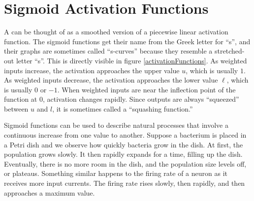 \section{Sigmoid Activation Functions}


A  can be thought of as a smoothed version of a piecewise linear activation function. The sigmoid functions get their name from the Greek letter for ``s'', and their graphs are sometimes called ``s-curves'' because they resemble a stretched-out letter ``s''. This is directly visible in figure \ref{activationFunctions}. As weighted inputs increase, the activation approaches the upper value $u$, which is usually $1$. As weighted inputs decrease, the activation approaches the lower value $\ell$, which is usually $0$ or $-1$. When weighted inputs are near the inflection point of the function at 0, activation changes rapidly. Since outputs are always ``squeezed'' between $u$ and $l$, it is sometimes called a ``squashing function.''

  Sigmoid functions can be used to describe natural processes that involve a continuous increase from one value to another. Suppose a bacterium is placed in a Petri dish and we observe how quickly bacteria grow in the dish. At first, the population grows slowly. It then rapidly expands for a time, filling up the dish. Eventually, there is no more room in the dish, and the population size levels off, or plateaus. Something similar happens to the firing rate of a neuron as it receives more input currents. The firing rate rises slowly, then rapidly, and then approaches a maximum value.

